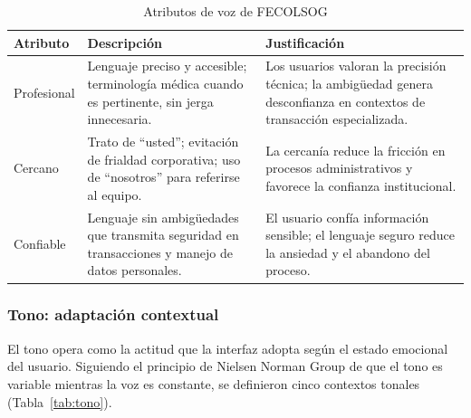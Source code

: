 \documentclass[conference]{IEEEtran}
\begin{document}
\begin{table}[H]
\centering
\caption{Atributos de voz de FECOLSOG}
\label{tab:voz}
\setlength{\tabcolsep}{3pt}
\renewcommand{\arraystretch}{1.2}
\begin{tabular}{|p{1.4cm}|p{2.8cm}|p{3cm}|}
\hline
\textbf{Atributo} & \textbf{Descripción} & \textbf{Justificación} \\
\hline
Profesional & Lenguaje preciso y accesible; terminología médica cuando es pertinente, sin jerga innecesaria. & Los usuarios valoran la precisión técnica; la ambigüedad genera desconfianza en contextos de transacción especializada. \\
\hline
Cercano & Trato de ``usted''; evitación de frialdad corporativa; uso de ``nosotros'' para referirse al equipo. & La cercanía reduce la fricción en procesos administrativos y favorece la confianza institucional. \\
\hline
Confiable & Lenguaje sin ambigüedades que transmita seguridad en transacciones y manejo de datos personales. & El usuario confía información sensible; el lenguaje seguro reduce la ansiedad y el abandono del proceso. \\
\hline
\end{tabular}
\end{table}

\subsubsection{Tono: adaptación contextual}

El tono opera como la actitud que la interfaz adopta según el estado emocional del usuario. Siguiendo el principio de Nielsen Norman Group \cite{nng-voice} de que el tono es variable mientras la voz es constante, se definieron cinco contextos tonales (Tabla~\ref{tab:tono}).
\end{document}
